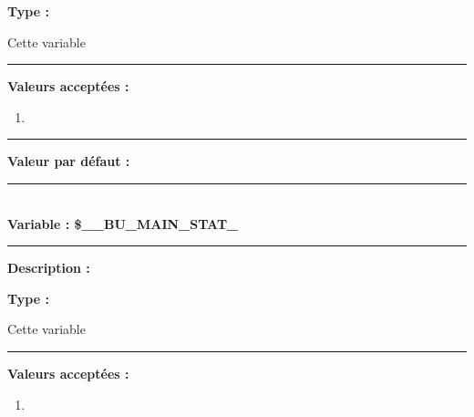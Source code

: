 \documentclass[a4paper,10pt]{article}
\begin{document}
\begin{justify}
    \textbf{Type : }
\end{justify}

\setlength{\parskip}{1em}

\begin{justify}
    Cette variable
\end{justify}

\par\noindent\rule{\textwidth}{0.4pt}

\textbf{Valeurs acceptées :}
\begin{enumerate}
    \item
\end{enumerate}

\par\noindent\rule{\textwidth}{0.4pt}

\textbf{Valeur par défaut :}




\color{vars}\par\noindent\rule{\textwidth}{0.4pt}\color{text}\\[1\baselineskip]

\textbf{Variable : \color{vars}\$\_\_BU\_MAIN\_STAT\_}\\[1\baselineskip]

\par\noindent\rule{\textwidth}{0.4pt}

\begin{justify}
    \textbf{Description :}
\end{justify}

\setlength{\parskip}{1em}

\begin{justify}
    \textbf{Type : }
\end{justify}

\setlength{\parskip}{1em}

\begin{justify}
    Cette variable
\end{justify}

\par\noindent\rule{\textwidth}{0.4pt}

\textbf{Valeurs acceptées :}
\begin{enumerate}
    \item
\end{enumerate}
\end{document}
